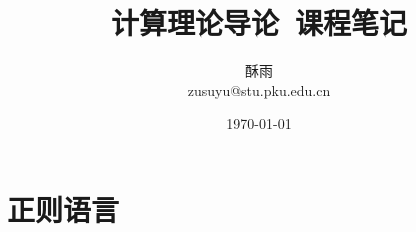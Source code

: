 \documentclass[8pt]{article}
\title{\heiti\zihao{1} 计算理论导论\ 课程笔记}
\author{\kaishu\zihao{-3} 酥雨\\zusuyu@stu.pku.edu.cn}
\date{\today}
\theoremstyle{compact}
\def\P{\textbf{P}}
\def\NP{\textbf{NP}}
\def\PSPACE{\textbf{PSPACE}}
\def\L{\textbf{L}}
\def\NL{\textbf{NL}}
\begin{document}
\pagestyle{plain}

\maketitle
\tableofcontents

\newpage
\section{正则语言}
\end{document}
